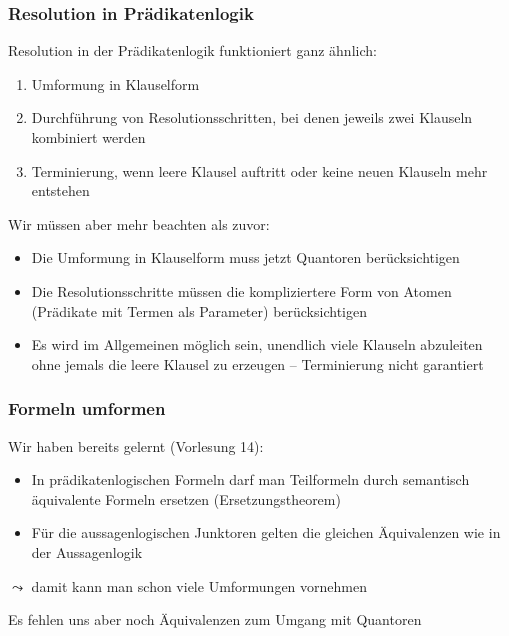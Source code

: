 \documentclass[aspectratio=1610,onlymath]{beamer}
\begin{document}
\begin{frame}\frametitle{Resolution in Prädikatenlogik}

Resolution in der Prädikatenlogik funktioniert ganz ähnlich:
\begin{enumerate}[(1)]
\item Umformung in Klauselform
\item Durchführung von Resolutionsschritten, bei denen jeweils zwei Klauseln kombiniert werden
\item Terminierung, wenn leere Klausel auftritt oder keine neuen Klauseln mehr entstehen
\end{enumerate}
\bigskip

Wir müssen aber mehr beachten als zuvor:
\begin{itemize}
\item Die Umformung in Klauselform muss jetzt \alert{Quantoren} berücksichtigen
\item Die Resolutionsschritte müssen die \alert{kompliziertere Form von Atomen} (Prädikate mit Termen als Parameter) berücksichtigen
\item Es wird im Allgemeinen möglich sein, unendlich viele Klauseln abzuleiten ohne jemals die leere Klausel zu erzeugen -- \alert{Terminierung nicht garantiert}
\end{itemize}

\end{frame}


\begin{frame}\frametitle{Formeln umformen}

Wir haben bereits gelernt (Vorlesung 14):
\begin{itemize}
\item In prädikatenlogischen Formeln darf man Teilformeln durch semantisch äquivalente
Formeln ersetzen (Ersetzungstheorem)
\item Für die aussagenlogischen Junktoren gelten die gleichen Äquivalenzen wie in der Aussagenlogik
\end{itemize}
$\leadsto$ damit kann man schon viele Umformungen vornehmen
\bigskip

Es fehlen uns aber noch Äquivalenzen zum Umgang mit Quantoren

\end{frame}
\end{document}
